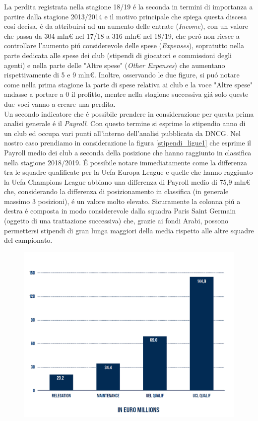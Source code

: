 \documentclass[
    corpo=12pt,
    oneside,
    evenboxes,
    tipotesi=triennale,
    stile=classica,
    oldstyle,
    autoretitolo,
    greek,
]{toptesi}
\begin{document}
\begin{interlinea}{1.5}
La perdita registrata nella stagione 18/19 \'e la seconda in termini di importanza a partire dalla stagione 2013/2014 e
il motivo principale che spiega questa discesa cos\'i decisa, \'e da attribuirsi ad un aumento delle entrate (\emph{Income}),
con un valore che passa da 304 mln€ nel 17/18 a 316 mln€ nel 18/19, che per\'o non riesce a controllare l'aumento pi\'u considerevole
delle spese (\emph{Expenses}), sopratutto nella parte dedicata alle spese dei club (stipendi di giocatori e commissioni degli agenti) 
e nella parte delle "Altre spese" (\emph{Other Expenses}) che aumentano rispettivamente di 5 e 9 mln€. Inoltre, osservando le due figure,
si pu\'o notare come nella prima stagione la parte di spese relativa ai club e la voce "Altre spese" andasse a portare a 0 il profitto,
mentre nella stagione successiva gi\'a solo queste due voci vanno a creare una perdita.\\
Un secondo indicatore che \'e possibile prendere in considerazione per questa prima analisi generale \'e il \emph{Payroll}. Con questo termine
si esprime lo stipendio anno di un club ed occupa vari punti all'interno dell'analisi pubblicata da DNCG. Nel nostro caso prendiamo 
in considerazione la figura \ref{stipendi_ligue1} che esprime il Payroll medio dei club a seconda della posizione che hanno raggiunto
in classifica nella stagione 2018/2019. \'E possibile notare immediatamente come la differenza tra le squadre qualificate per 
la Uefa Europa League e quelle che hanno raggiunto la Uefa Champions League abbiano una differenza di Payroll medio di 75,9 mln€ 
che, considerando la differenza di posizionamento in classifica (in generale massimo 3 posizioni), \'e un valore molto elevato. 
Sicuramente la colonna pi\'u a destra \'e composta in modo considerevole dalla squadra Paris Saint Germain 
(oggetto di una trattazione successiva) che, grazie ai fondi Arabi, possono permettersi
stipendi di gran lunga maggiori della media rispetto alle altre squadre del campionato.
\begin{figure}
    \centering
    \includegraphics[scale=.5]{img/stipendi_ligue1.png}

\end{figure}
\end{interlinea}
\end{document}
